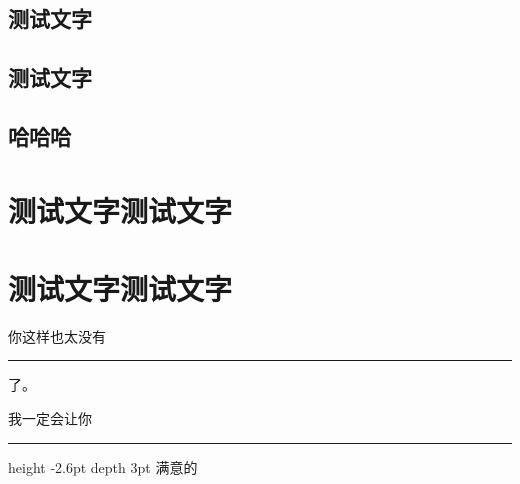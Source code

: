 \documentclass[themecolor=brown]{textbook-cn}%
\begin{document}
\chapter{测试文字}
\zhlipsum

\cleardoublepage

\lipsum
%
%
%
\chapter{测试文字}






\chapter{哈哈哈}

{
\FontSizeSet[0.8]{14pt}
\zhlipsum[2]
}

\partintro{\lipsum[2]}
\part*{测试文字测试文字}

\zhlipsum
%
%
\partsubtitle{ }
\partintro{\lipsum[2]}
\part*{测试文字测试文字}
%
\zhlipsum

你这样也太没有 \leaders \hrule{} 了。

我一定会让你 \leaders \hrule height
-2.6pt depth 3pt \hskip 2cm 满意的
\end{document}
